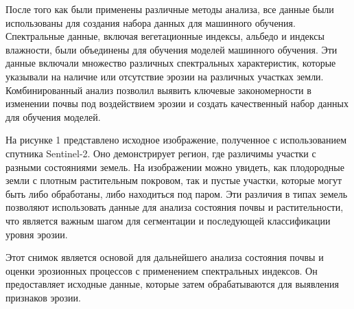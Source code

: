 \begin{multicols}{2}
После того как были применены различные методы анализа, все данные были
использованы для создания набора данных для машинного обучения.
Спектральные данные, включая вегетационные индексы, альбедо и индексы
влажности, были объединены для обучения моделей машинного обучения. Эти
данные включали множество различных спектральных характеристик, которые
указывали на наличие или отсутствие эрозии на различных участках земли.
Комбинированный анализ позволил выявить ключевые закономерности в
изменении почвы под воздействием эрозии и создать качественный набор
данных для обучения моделей.

На рисунке 1 представлено исходное изображение, полученное с
использованием спутника Sentinel-2. Оно демонстрирует регион, где
различимы участки с разными состояниями земель. На изображении можно
увидеть, как плодородные земли с плотным растительным покровом, так и
пустые участки, которые могут быть либо обработаны, либо находиться под
паром. Эти различия в типах земель позволяют использовать данные для
анализа состояния почвы и растительности, что является важным шагом для
сегментации и последующей классификации уровня эрозии.

Этот снимок является основой для дальнейшего анализа состояния почвы и
оценки эрозионных процессов с применением спектральных индексов. Он
предоставляет исходные данные, которые затем обрабатываются для
выявления признаков эрозии.
\end{multicols}


